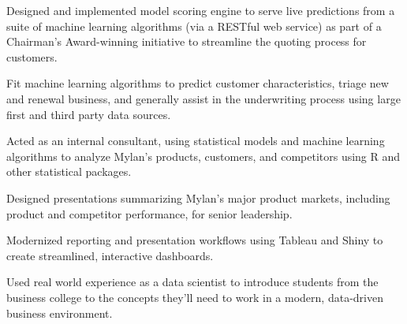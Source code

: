 \documentclass[letterpaper]{deedy-resume} %
\begin{document}
\begin{minipage}[t]{0.9\textwidth}
			\hfill
			\begin{tightitemize}  
				\item Designed and implemented model scoring engine to serve live predictions from a suite of machine learning algorithms (via a RESTful web service) as part of a Chairman's Award-winning initiative to streamline the quoting process for customers.
				\item Fit machine learning algorithms to predict customer characteristics, triage new and renewal business, and generally assist in the underwriting process using large first and third party data sources.
			\end{tightitemize}
		\sectionspace
		
		\hfill{}
			\hfill{}
			\begin{tightitemize}
				\item Acted as an internal consultant, using statistical models and machine learning algorithms to analyze Mylan's products, customers, and competitors using R and other statistical packages.
				\item Designed presentations summarizing Mylan's major product markets, including product and competitor performance, for senior leadership.
				\item Modernized reporting and presentation workflows using Tableau and Shiny to create streamlined, interactive dashboards.
			\end{tightitemize}
		\sectionspace
		
		\hfill{}
			\hfill
			\begin{tightitemize}
				\item Used real world experience as a data scientist to introduce students from the business college to the concepts they'll need to work in a modern, data-driven  business environment.
			\end{tightitemize}
		\sectionspace
		

\end{minipage}
\end{document}
